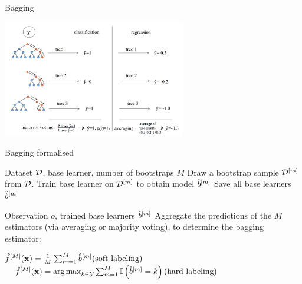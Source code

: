 \documentclass[11pt,compress,t,notes=noshow, xcolor=table]{beamer}
\begin{document}
\begin{vbframe}{Bagging}
\begin{center}
\includegraphics[width=0.6\textwidth]{figure_man/rf_majvot_averaging.png}
\end{center}
\end{vbframe}


\begin{vbframe}{Bagging formalised}

\begin{algorithm}[H]
  \footnotesize
  \caption*{Bagging algorithm: Training}
  \begin{algorithmic}[1]
     Dataset $\mathcal{D}$, base learner, number of bootstraps $M$
      \State Draw a bootstrap sample $\mathcal{D}^{[m]}$ from $\mathcal{D}$.
      \State Train base learner on $\mathcal{D}^{[m]}$ to obtain model $\hat{b}^{[m]}$
    \EndFor
    \State Save all base learners $\hat{b}^{[m]}$
  \end{algorithmic}
\end{algorithm}

\begin{algorithm}[H]
  \footnotesize
  \caption*{Bagging algorithm: Inference}
  \begin{algorithmic}[1]
     Observation $o$, trained base learners $\hat{b}^{[m]}$
    \State Aggregate the predictions of the $M$ estimators (via averaging or majority voting), to determine the bagging estimator:
    \begin{center}
    $\hat f^{[M]}(\mathbf{x}) = \frac{1}{M} \sum_{m=1}^M \hat{b}^{[m]} \text{(soft labeling)}$
    $\quad \hat f^{[M]}(\mathbf{x}) = \operatorname*{arg\,max}_{k \in \mathcal{Y}} \sum_{m=1}^M \mathbb{I}\left(\hat{b}^{[m]} = k\right) \text{(hard labeling)}$
    \end{center}
  \end{algorithmic}
\end{algorithm}

\end{vbframe}
\end{document}
